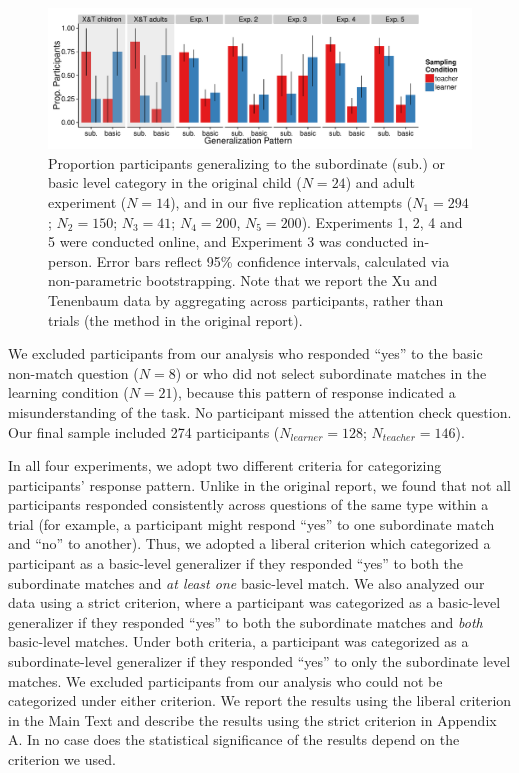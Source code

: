 \documentclass[man]{apa2}
\begin{document}
 \begin{figure} [t]
 \begin{center} 
 \includegraphics[width=6.2in]{figures/FIG_2.pdf} 
 \caption{\label{fig:bar_plots} Proportion participants generalizing to the subordinate (sub.) or basic level category in the original child ($N = 24$) and adult experiment ($N = 14$), and in our five replication attempts ($N_{1} = 294$; $N_{2} = 150$; $N_{3} = 41$; $N_{4} = 200$, $N_{5} = 200$). Experiments 1, 2, 4 and 5 were conducted online, and Experiment 3 was conducted in-person. Error bars reflect 95\% confidence intervals, calculated via non-parametric bootstrapping. Note that we report the Xu and Tenenbaum data by aggregating across participants, rather than trials (the method in the original report).} 
 \end{center} 
\end{figure}

We excluded participants from our analysis who responded ``yes'' to the basic non-match question ($N=8$) or who did not select subordinate matches in the learning condition ($N = 21$), because this pattern of response indicated a misunderstanding of the task. No participant missed the attention check question. Our final sample included 274 participants ($N_{learner} = 128$; $N_{teacher} = 146$).

In all four experiments, we adopt two different criteria for categorizing participants' response pattern. Unlike in the original report, we found that not all participants responded consistently across questions of the same type within a trial (for example, a participant might respond ``yes'' to one subordinate match and ``no'' to another). Thus, we adopted a liberal criterion which categorized a participant as a basic-level generalizer if they responded ``yes'' to both the subordinate matches and {\it at least one} basic-level match. We also analyzed our data using a strict criterion, where a participant was categorized as a basic-level generalizer if they responded ``yes'' to both the subordinate matches and {\it both} basic-level matches. Under both criteria, a participant was categorized as a subordinate-level generalizer if they responded ``yes'' to only the subordinate level matches. We excluded participants from our analysis who could not be categorized under either criterion. We report the results using the liberal criterion in the Main Text and describe the results using the strict criterion in Appendix A. In no case does the statistical significance of the results depend on the criterion we used. 
\end{document}

